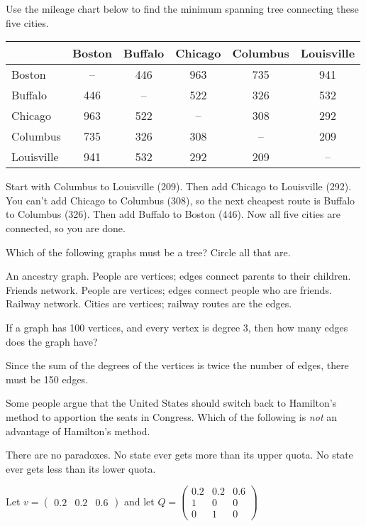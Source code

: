 \documentclass[11pt,answers]{exam}
\begin{document}
\begin{questions}
\question Use the mileage chart below to find the minimum spanning tree connecting these five cities.  
\begin{center}
\begin{tabular}{l|ccccc}
& Boston & Buffalo & Chicago & Columbus & Louisville \\ \hline
Boston & -- & 446 & 963 & 735 & 941 \\ 
Buffalo & 446 & -- & 522 & 326 & 532 \\ 
Chicago & 963 & 522 & -- & 308 & 292 \\
Columbus & 735 & 326 & 308 & -- & 209 \\
Louisville & 941 & 532 & 292 & 209 & -- 
\end{tabular}
\end{center}
\begin{solution}
Start with Columbus to Louisville (209).  Then add Chicago to Louisville (292).  You can't add Chicago to Columbus (308), so the next cheapest route is Buffalo to Columbus (326).  Then add Buffalo to Boston (446).  Now all five cities are connected, so you are done.  
\end{solution}
\vfill

\question Which of the following graphs must be a tree?  Circle all that are.  
\begin{choices}
\CorrectChoice An ancestry graph.  People are vertices; edges connect parents to their children.
\choice Friends network.  People are vertices; edges connect people who are friends.  
\choice Railway network. Cities are vertices; railway routes are the edges.
\end{choices}
\bigskip

\question If a graph has 100 vertices, and every vertex is degree 3, then how many edges does the graph have?
\begin{solution}
Since the sum of the degrees of the vertices is twice the number of edges, there must be 150 edges. 
\end{solution}
\vfill

\question Some people argue that the United States should switch back to Hamilton's method to apportion the seats in Congress.  Which of the following is \emph{not} an advantage of Hamilton's method. 
\begin{choices}
\CorrectChoice There are no paradoxes. 
\choice No state ever gets more than its upper quota.
\choice No state ever gets less than its lower quota.
\end{choices}

\newpage
\question Let $v = \begin{pmatrix} 0.2 &  0.2 & 0.6 \end{pmatrix}$ and let $Q = \begin{pmatrix} 0.2 & 0.2 & 0.6 \\ 1 & 0 & 0 \\ 0 & 1 & 0 \end{pmatrix}$
\begin{parts}

\end{parts}
\end{questions}
\end{document}
